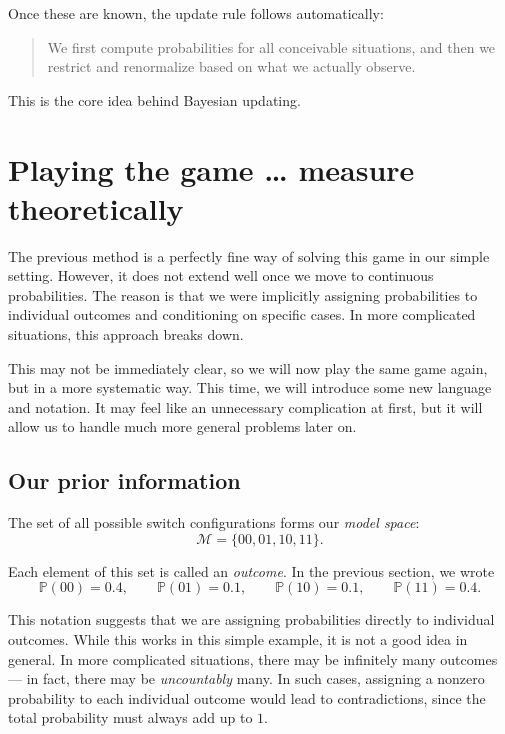 \documentclass[11pt]{article}
\theoremstyle{remark}
\newcommand{\modelspace}{\mathcal{M}}
\begin{document}
Once these are known, the update rule follows automatically:
\begin{quote}
We first compute probabilities for all conceivable situations, and then we restrict and renormalize based on what we actually observe.
\end{quote}

This is the core idea behind Bayesian updating.


\section{Playing the game \ldots{} measure theoretically}

The previous method is a perfectly fine way of solving this game in our simple setting. However, it does not extend well once we move to continuous probabilities. The reason is that we were implicitly assigning probabilities to individual outcomes and conditioning on specific cases. In more complicated situations, this approach breaks down.

This may not be immediately clear, so we will now play the same game again, but in a more systematic way. This time, we will introduce some new language and notation. It may feel like an unnecessary complication at first, but it will allow us to handle much more general problems later on.

\vspace{2mm}

\subsection{Our prior information}

The set of all possible switch configurations forms our \emph{model space}:
\begin{equation}
    \modelspace = \{00, 01, 10, 11\}.
\end{equation}

Each element of this set is called an \emph{outcome}. In the previous section, we wrote
\[
\mathbb P(00)=0.4,\qquad
\mathbb P(01)=0.1,\qquad
\mathbb P(10)=0.1,\qquad
\mathbb P(11)=0.4.
\]

This notation suggests that we are assigning probabilities directly to individual outcomes. While this works in this simple example, it is not a good idea in general. In more complicated situations, there may be infinitely many outcomes --- in fact, there may be \emph{uncountably} many. In such cases, assigning a nonzero probability to each individual outcome would lead to contradictions, since the total probability must always add up to \(1\).
\end{document}

